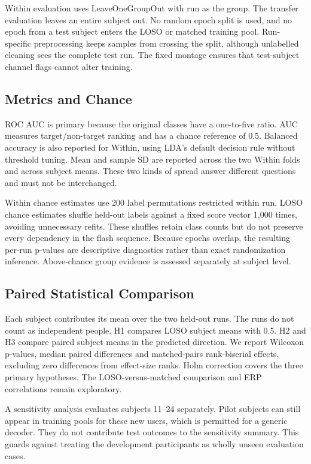 \documentclass[conference]{IEEEtran}
\begin{document}
Within evaluation uses LeaveOneGroupOut with run as the group. The transfer evaluation
leaves an entire subject out. No random epoch split is used, and no epoch from a test
subject enters the LOSO or matched training pool. Run-specific preprocessing keeps
samples from crossing the split, although unlabelled cleaning sees the complete test
run. The fixed montage ensures that test-subject channel flags cannot alter training.

\subsection{Metrics and Chance}
ROC AUC is primary because the original classes have a one-to-five ratio. AUC measures
target/non-target ranking and has a chance reference of 0.5. Balanced accuracy is also
reported for Within, using LDA's default decision rule without threshold tuning.
Mean and sample SD are reported across the two Within folds and across subject means.
These two kinds of spread answer different questions and must not be interchanged.

Within chance estimates use 200 label permutations restricted within run. LOSO chance
estimates shuffle held-out labels against a fixed score vector 1,000 times, avoiding
unnecessary refits. These shuffles retain class counts but do not preserve every
dependency in the flash sequence. Because epochs overlap, the resulting per-run
p-values are descriptive diagnostics rather than exact randomization inference.
Above-chance group evidence is assessed separately at subject level.

\subsection{Paired Statistical Comparison}
Each subject contributes its mean over the two held-out runs. The runs do not count
as independent people. H1 compares LOSO subject means with 0.5. H2 and H3 compare
paired subject means in the predicted direction. We report Wilcoxon p-values, median
paired differences and matched-pairs rank-biserial effects, excluding zero differences
from effect-size ranks. Holm correction covers the three primary hypotheses.
The LOSO-versus-matched comparison and ERP correlations remain exploratory.

A sensitivity analysis evaluates subjects 11--24 separately. Pilot subjects can still
appear in training pools for these new users, which is permitted for a generic decoder.
They do not contribute test outcomes to the sensitivity summary. This guards against
treating the development participants as wholly unseen evaluation cases.
\end{document}
